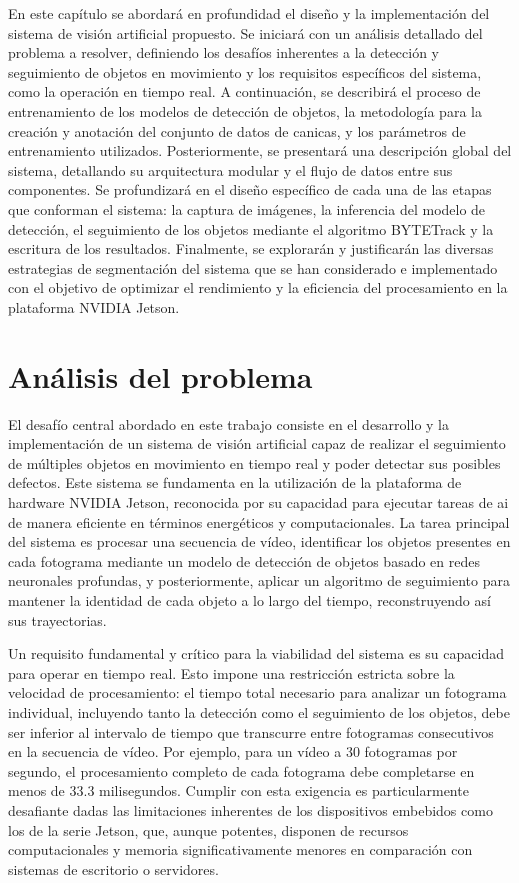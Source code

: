 \documentclass[11pt,spanish,listoffigures,listoftables]{tfgetsinf}
\begin{document}
En este capítulo se abordará en profundidad el diseño y la implementación del sistema de visión artificial propuesto. Se iniciará con un análisis detallado del problema a resolver, definiendo los desafíos inherentes a la detección y seguimiento de objetos en movimiento y los requisitos específicos del sistema, como la operación en tiempo real. A continuación, se describirá el proceso de entrenamiento de los modelos de detección de objetos, la metodología para la creación y anotación del conjunto de datos de canicas, y los parámetros de entrenamiento utilizados. Posteriormente, se presentará una descripción global del sistema, detallando su arquitectura modular y el flujo de datos entre sus componentes. Se profundizará en el diseño específico de cada una de las etapas que conforman el sistema: la captura de imágenes, la inferencia del modelo de detección, el seguimiento de los objetos mediante el algoritmo BYTETrack y la escritura de los resultados. Finalmente, se explorarán y justificarán las diversas estrategias de segmentación del sistema que se han considerado e implementado con el objetivo de optimizar el rendimiento y la eficiencia del procesamiento en la plataforma NVIDIA Jetson.



\section{Análisis del problema}\label{sec:analisis_problema}

El desafío central abordado en este trabajo consiste en el desarrollo y la implementación de un sistema de visión artificial capaz de realizar el seguimiento de múltiples objetos en movimiento en tiempo real y poder detectar sus posibles defectos. Este sistema se fundamenta en la utilización de la plataforma de hardware NVIDIA Jetson, reconocida por su capacidad para ejecutar tareas de \gls{ai} de manera eficiente en términos energéticos y computacionales. La tarea principal del sistema es procesar una secuencia de vídeo, identificar los objetos presentes en cada fotograma mediante un modelo de detección de objetos basado en redes neuronales profundas, y posteriormente, aplicar un algoritmo de seguimiento para mantener la identidad de cada objeto a lo largo del tiempo, reconstruyendo así sus trayectorias.

Un requisito fundamental y crítico para la viabilidad del sistema es su capacidad para operar en tiempo real. Esto impone una restricción estricta sobre la velocidad de procesamiento: el tiempo total necesario para analizar un fotograma individual, incluyendo tanto la detección como el seguimiento de los objetos, debe ser inferior al intervalo de tiempo que transcurre entre fotogramas consecutivos en la secuencia de vídeo. Por ejemplo, para un vídeo a 30 fotogramas por segundo, el procesamiento completo de cada fotograma debe completarse en menos de 33.3 milisegundos. Cumplir con esta exigencia es particularmente desafiante dadas las limitaciones inherentes de los dispositivos embebidos como los de la serie Jetson, que, aunque potentes, disponen de recursos computacionales y memoria significativamente menores en comparación con sistemas de escritorio o servidores.
\end{document}
